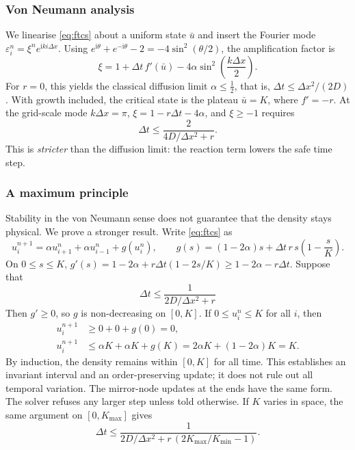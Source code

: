 \documentclass[11pt,a4paper]{article}
\begin{document}
\subsubsection{Von Neumann analysis}
We linearise \eqref{eq:ftcs} about a uniform state $\bar u$ and insert the Fourier mode
$\varepsilon_i^n=\xi^n e^{\mathrm{i}ki\Delta x}$. Using $e^{\mathrm{i}\theta}+e^{-\mathrm{i}\theta}-2=-4\sin^2(\theta/2)$, the amplification
factor is
\begin{equation}
  \xi=1+\Delta t\,f'(\bar u)-4\alpha\sin^2\!\left(\frac{k\Delta x}{2}\right).
\end{equation}
For $r=0$, this yields the classical diffusion limit $\alpha\le\tfrac12$, that is,
$\Delta t\le\Delta x^2/(2D)$. With growth included, the critical state is the plateau $\bar u=K$, where
$f'=-r$. At the grid-scale mode $k\Delta x=\pi$, $\xi=1-r\Delta t-4\alpha$, and $\xi\ge-1$ requires
\begin{equation}
  \Delta t\le\frac{2}{4D/\Delta x^2+r}.
  \label{eq:vonneumann}
\end{equation}
This is \emph{stricter} than the diffusion limit: the reaction term lowers the safe time step.

\subsubsection{A maximum principle}
Stability in the von Neumann sense does not guarantee that the density stays physical. We prove a
stronger result. Write \eqref{eq:ftcs} as
\begin{equation}
  u_i^{n+1}=\alpha u_{i+1}^n+\alpha u_{i-1}^n+g(u_i^n),\qquad
  g(s)=(1-2\alpha)s+\Delta t\,r\,s\left(1-\frac{s}{K}\right).
\end{equation}
On $0\le s\le K$, $g'(s)=1-2\alpha+r\Delta t(1-2s/K)\ge1-2\alpha-r\Delta t$. Suppose that
\begin{equation}
  \boxed{\;\Delta t\le\frac{1}{2D/\Delta x^2+r}\;}
  \label{eq:monotone}
\end{equation}
Then $g'\ge0$, so $g$ is non-decreasing on $[0,K]$. If $0\le u_i^n\le K$ for all $i$, then
\begin{align}
  u_i^{n+1}&\ge 0+0+g(0)=0,\\
  u_i^{n+1}&\le \alpha K+\alpha K+g(K)=2\alpha K+(1-2\alpha)K=K .
\end{align}
By induction, the density remains within $[0,K]$ for all time. This establishes an invariant interval and an order-preserving update; it does not rule out all temporal variation.
The mirror-node updates at the ends have the same form. The solver refuses any larger step unless
told otherwise. If $K$ varies in space, the same argument on $[0,K_{\max}]$ gives
\begin{equation}
  \Delta t\le\frac{1}{2D/\Delta x^2+r\,(2K_{\max}/K_{\min}-1)}.
  \label{eq:monotonevar}
\end{equation}
\end{document}
